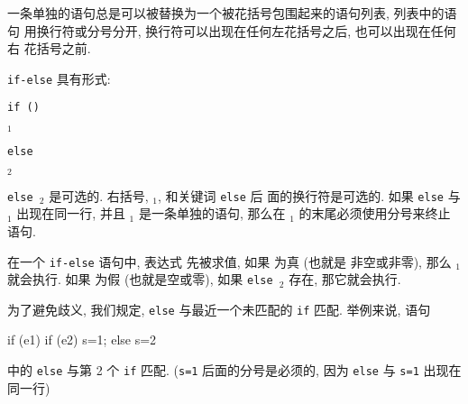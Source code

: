 一条单独的语句总是可以被替换为一个被花括号包围起来的语句列表, 列表中的语句
用换行符或分号分开, 换行符可以出现在任何左花括号之后, 也可以出现在任何右
花括号之前.

\verb'if-else' 具有形式:
\begin{pattern}
    \verb'if ('\expr\verb')' \par
    \indent\indent\stmt$_1$ \par
    \verb'else' \par
    \indent\indent\stmt$_2$ \par
\end{pattern}
\verb'else '\stmt$_2$ 是可选的. 右括号, \stmt$_1$, 和关键词 \verb'else' 后
面的换行符是可选的. 如果 \verb'else' 与 \stmt$_1$ 出现在同一行, 并且
\stmt$_1$ 是一条单独的语句, 那么在 \stmt$_1$ 的末尾必须使用分号来终止语句.

在一个 \verb'if-else' 语句中, 表达式 \expr 先被求值, 如果 \expr 为真 (也就是
非空或非零), 那么 \stmt$_1$ 就会执行. 如果 \expr 为假 (也就是空或零),
如果 \verb'else '\stmt$_2$ 存在, 那它就会执行.

为了避免歧义, 我们规定, \verb'else' 与最近一个未匹配的 \verb'if' 匹配.
举例来说, 语句
\begin{awkcode}
    if (e1) if (e2) s=1; else s=2
\end{awkcode}
中的 \verb'else' 与第 2 个 \verb'if' 匹配. (\verb's=1' 后面的分号是必须的,
因为 \verb'else' 与 \verb's=1' 出现在同一行)

